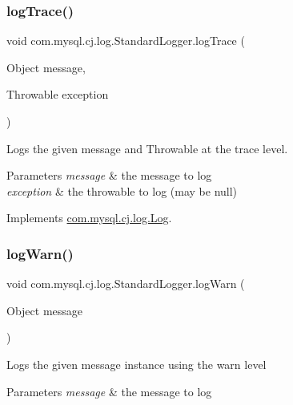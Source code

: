 \subsubsection{\texorpdfstring{log\+Trace()}{logTrace()}\hspace{0.1cm}{\footnotesize\ttfamily [2/2]}}
{\footnotesize\ttfamily void com.\+mysql.\+cj.\+log.\+Standard\+Logger.\+log\+Trace (\begin{DoxyParamCaption}\item[{Object}]{message,  }\item[{Throwable}]{exception }\end{DoxyParamCaption})}

Logs the given message and Throwable at the \textquotesingle{}trace\textquotesingle{} level.


\begin{DoxyParams}{Parameters}
{\em message} & the message to log \\
\hline
{\em exception} & the throwable to log (may be null) \\
\hline
\end{DoxyParams}


Implements \mbox{\hyperlink{interfacecom_1_1mysql_1_1cj_1_1log_1_1_log_aa93fa5550a3152afd64479adca676200}{com.\+mysql.\+cj.\+log.\+Log}}.

\mbox{\label{classcom_1_1mysql_1_1cj_1_1log_1_1_standard_logger_a5197952ca4b6dfe59a54c1aa095717f7}} 
\subsubsection{\texorpdfstring{log\+Warn()}{logWarn()}\hspace{0.1cm}{\footnotesize\ttfamily [1/2]}}
{\footnotesize\ttfamily void com.\+mysql.\+cj.\+log.\+Standard\+Logger.\+log\+Warn (\begin{DoxyParamCaption}\item[{Object}]{message }\end{DoxyParamCaption})}

Logs the given message instance using the \textquotesingle{}warn\textquotesingle{} level


\begin{DoxyParams}{Parameters}
{\em message} & the message to log \\
\hline
\end{DoxyParams}


